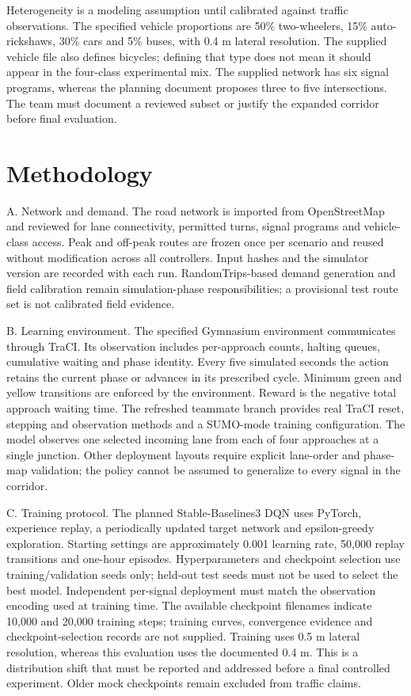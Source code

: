 \documentclass[conference]{IEEEtran}
\begin{document}
Heterogeneity is a modeling assumption until calibrated against traffic observations. The specified vehicle proportions are 50\% two-wheelers, 15\% auto-rickshaws, 30\% cars and 5\% buses, with 0.4 m lateral resolution. The supplied vehicle file also defines bicycles; defining that type does not mean it should appear in the four-class experimental mix. The supplied network has six signal programs, whereas the planning document proposes three to five intersections. The team must document a reviewed subset or justify the expanded corridor before final evaluation.

\section{Methodology}
A. Network and demand. The road network is imported from OpenStreetMap and reviewed for lane connectivity, permitted turns, signal programs and vehicle-class access. Peak and off-peak routes are frozen once per scenario and reused without modification across all controllers. Input hashes and the simulator version are recorded with each run. RandomTrips-based demand generation and field calibration remain simulation-phase responsibilities; a provisional test route set is not calibrated field evidence.

B. Learning environment. The specified Gymnasium environment communicates through TraCI. Its observation includes per-approach counts, halting queues, cumulative waiting and phase identity. Every five simulated seconds the action retains the current phase or advances in its prescribed cycle. Minimum green and yellow transitions are enforced by the environment. Reward is the negative total approach waiting time. The refreshed teammate branch provides real TraCI reset, stepping and observation methods and a SUMO-mode training configuration. The model observes one selected incoming lane from each of four approaches at a single junction. Other deployment layouts require explicit lane-order and phase-map validation; the policy cannot be assumed to generalize to every signal in the corridor.

C. Training protocol. The planned Stable-Baselines3 DQN uses PyTorch, experience replay, a periodically updated target network and epsilon-greedy exploration. Starting settings are approximately 0.001 learning rate, 50,000 replay transitions and one-hour episodes. Hyperparameters and checkpoint selection use training/validation seeds only; held-out test seeds must not be used to select the best model. Independent per-signal deployment must match the observation encoding used at training time. The available checkpoint filenames indicate 10,000 and 20,000 training steps; training curves, convergence evidence and checkpoint-selection records are not supplied. Training uses 0.5 m lateral resolution, whereas this evaluation uses the documented 0.4 m. This is a distribution shift that must be reported and addressed before a final controlled experiment. Older mock checkpoints remain excluded from traffic claims.
\end{document}
